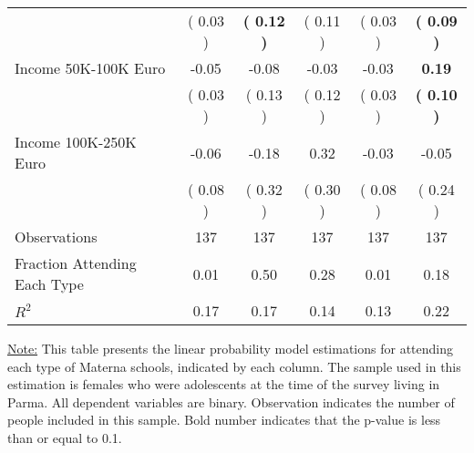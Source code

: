 \begin{table}[H]
{\begin{tabular}{lccccc}
\quad  & (     0.03 ) & \textbf{(     0.12 )}  & (     0.11 )  & (     0.03 ) & \textbf{(     0.09 )} \\
\quad Income 50K-100K Euro &     -0.05 &     -0.08 &     -0.03 &     -0.03 & \textbf{     0.19} \\
\quad  & (     0.03 ) & (     0.13 )  & (     0.12 )  & (     0.03 ) & \textbf{(     0.10 )} \\
\quad Income 100K-250K Euro &     -0.06 &     -0.18 &      0.32 &     -0.03 &     -0.05 \\
\quad  & (     0.08 ) & (     0.32 )  & (     0.30 )  & (     0.08 ) & (     0.24 ) \\
\midrule
Observations & 137 & 137 & 137 & 137 & 137 \\
Fraction Attending Each Type &      0.01 &      0.50 &      0.28 &      0.01 &      0.18 \\
\midrule
$ R^2$ &      0.17 &      0.17 &      0.14 &      0.13 &      0.22 \\
\bottomrule
\end{tabular}}
\end{table}
\begin{footnotesize}
\noindent\underline{Note:} This table presents the linear probability model estimations for attending each type of Materna schools, indicated by each column. The sample used in this estimation is females who were adolescents at the time of the survey living in Parma. All dependent variables are binary. Observation indicates the number of people included in this sample. Bold number indicates that the p-value is less than or equal to 0.1.
\end{footnotesize}
